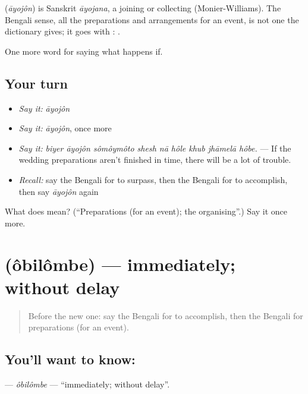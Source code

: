 \begin{cousinweb}
\textbf{} (\emph{āyojôn}) is Sanskrit \emph{āyojana}, a joining or collecting (Monier-Williams). The Bengali sense, all the preparations and arrangements for an event, is not one the dictionary gives; it goes with :   .
\end{cousinweb}

\begin{grammarlens}[title={What you've built}]
One more word for saying what happens if.
\end{grammarlens}

\subsection*{Your turn}
\begin{itemize}
\raggedright
  \item \emph{Say it:} \emph{āyojôn}
  \item \emph{Say it:} \emph{āyojôn}, once more
  \item \emph{Say it:} \emph{biyer āyojôn sômôymôto shesh nā hôle khub jhāmelā hôbe.} — If the wedding preparations aren't finished in time, there will be a lot of trouble.
  \item \emph{Recall:} say the Bengali for to surpass, then the Bengali for to accomplish, then say \emph{āyojôn} again
\end{itemize}

\begin{tcolorbox}[breakable,colback=teal!4,colframe=teal!35!black,title={Before you move on}]
What does  mean? (\textquotedblleft{}Preparations (for an event); the organising\textquotedblright{}.) Say it once more.
\end{tcolorbox}
\section[\texorpdfstring{\bn{অবিলম্বে} (ôbilômbe)}{অবিলম্বে (ôbilômbe)}]{ (ôbilômbe) — immediately; without delay}

\label{lesson:BN-C378-obilombe}



\begin{quote}
Before the new one: say the Bengali for to accomplish, then the Bengali for preparations (for an event).
\end{quote}

\subsection*{You'll want to know: }
\textbf{} — \emph{ôbilômbe} — \textquotedblleft{}immediately; without delay\textquotedblright{}.

